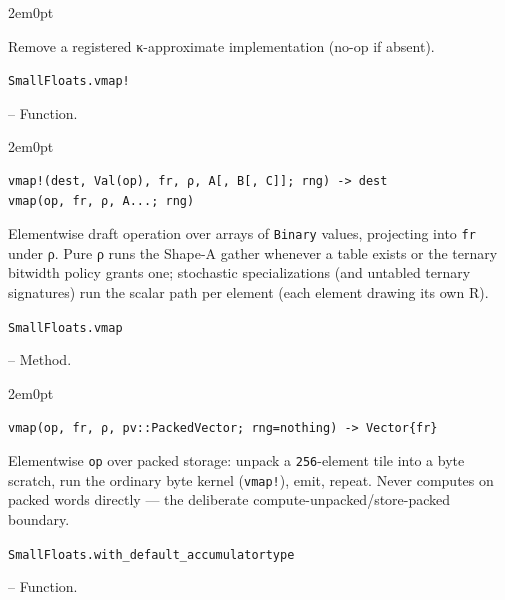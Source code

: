 \begin{adjustwidth}{2em}{0pt}

Remove a registered κ-approximate implementation (no-op if absent).



\end{adjustwidth}
\hypertarget{12243573033237441134}{\texttt{SmallFloats.vmap!}}  -- {Function.}

\begin{adjustwidth}{2em}{0pt}


\begin{verbatim}
vmap!(dest, Val(op), fr, ρ, A[, B[, C]]; rng) -> dest
vmap(op, fr, ρ, A...; rng)
\end{verbatim}

Elementwise draft operation over arrays of \texttt{Binary} values, projecting into \texttt{fr} under ρ. Pure ρ runs the Shape-A gather whenever a table exists or the ternary bitwidth policy grants one; stochastic specializations (and untabled ternary signatures) run the scalar path per element (each element drawing its own R).



\end{adjustwidth}
\hypertarget{14797466715659470848}{\texttt{SmallFloats.vmap}}  -- {Method.}

\begin{adjustwidth}{2em}{0pt}


\begin{verbatim}
vmap(op, fr, ρ, pv::PackedVector; rng=nothing) -> Vector{fr}
\end{verbatim}

Elementwise \texttt{op} over packed storage: unpack a \texttt{256}-element tile into a byte scratch, run the ordinary byte kernel (\texttt{vmap!}), emit, repeat. Never computes on packed words directly — the deliberate compute-unpacked/store-packed boundary.



\end{adjustwidth}
\hypertarget{10552114894679459838}{\texttt{SmallFloats.with\_default\_accumulatortype}}  -- {Function.}

